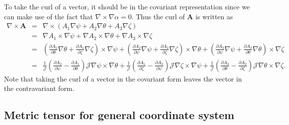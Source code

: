 \documentclass{llncs}
\begin{document}
To take the curl of a vector, it should be in the covariant representation
since we can make use of the fact that $\nabla \times \nabla \alpha = 0$. Thus
the curl of $\mathbf{A}$ is written as
\begin{eqnarray}
  \nabla \times \mathbf{A} & = & \nabla \times (A_1 \nabla \psi + A_2 \nabla
  \theta + A_3 \nabla \zeta) \nonumber\\
  & = & \nabla A_1 \times \nabla \psi + \nabla A_2 \times \nabla \theta +
  \nabla A_3 \times \nabla \zeta \nonumber\\
  & = & \left( \frac{\partial A_1}{\partial \theta} \nabla \theta +
  \frac{\partial A_1}{\partial \zeta} \nabla \zeta \right) \times \nabla \psi
  + \left( \frac{\partial A_2}{\partial \psi} \nabla \psi + \frac{\partial
  A_2}{\partial \zeta} \nabla \zeta \right) \times \nabla \theta + \left(
  \frac{\partial A_3}{\partial \psi} \nabla \psi + \frac{\partial
  A_3}{\partial \theta} \nabla \theta \right) \times \nabla \zeta \nonumber\\
  & = & \frac{1}{\mathcal{J}} \left( \frac{\partial A_2}{\partial \psi} -
  \frac{\partial A_1}{\partial \theta} \right) \mathcal{J} \nabla \psi \times
  \nabla \theta + \frac{1}{\mathcal{J}} \left( \frac{\partial A_1}{\partial
  \zeta} - \frac{\partial A_3}{\partial \psi} \right) \mathcal{J} \nabla \zeta
  \times \nabla \psi + \frac{1}{\mathcal{J}} \left( \frac{\partial
  A_3}{\partial \theta} - \frac{\partial A_2}{\partial \zeta} \right)
  \mathcal{J} \nabla \theta \times \nabla \zeta .  \label{4-16-2}
\end{eqnarray}
Note that taking the curl of a vector in the covariant form leaves the vector
in the contravariant form.

\subsection{Metric tensor for general coordinate system}
\end{document}
